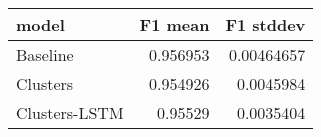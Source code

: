 \begin{tabular}{lrr}
\toprule
 model         &   F1 mean &   F1 stddev \\
\midrule
 Baseline      &  0.956953 &  0.00464657 \\
 Clusters      &  0.954926 &  0.0045984  \\
 Clusters-LSTM &  0.95529  &  0.0035404  \\
\bottomrule
\end{tabular}